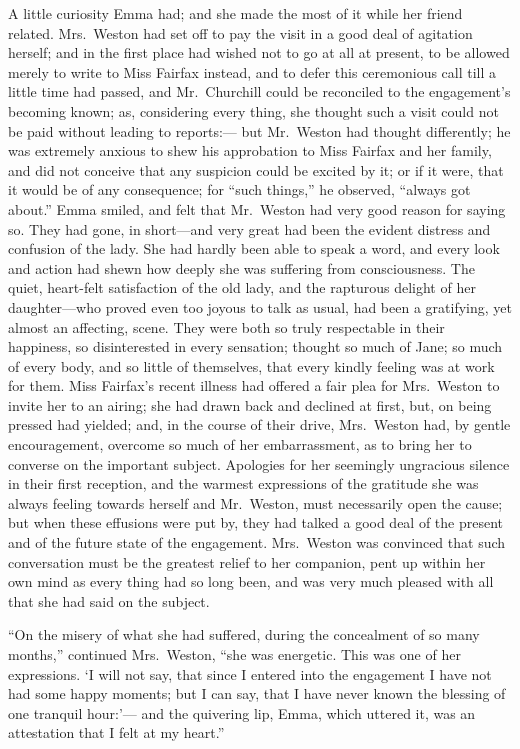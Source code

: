 A little curiosity Emma had; and she made the most of it while
her friend related.  Mrs.\ Weston had set off to pay the visit
in a good deal of agitation herself; and in the first place had
wished not to go at all at present, to be allowed merely to write
to Miss Fairfax instead, and to defer this ceremonious call till
a little time had passed, and Mr.\ Churchill could be reconciled
to the engagement's becoming known; as, considering every thing,
she thought such a visit could not be paid without leading to reports:---%
but Mr.\ Weston had thought differently; he was extremely anxious
to shew his approbation to Miss Fairfax and her family, and did not
conceive that any suspicion could be excited by it; or if it were,
that it would be of any consequence; for ``such things,'' he observed,
``always got about.''  Emma smiled, and felt that Mr.\ Weston had
very good reason for saying so.  They had gone, in short---and very
great had been the evident distress and confusion of the lady.
She had hardly been able to speak a word, and every look and action
had shewn how deeply she was suffering from consciousness.  The quiet,
heart-felt satisfaction of the old lady, and the rapturous delight
of her daughter---who proved even too joyous to talk as usual,
had been a gratifying, yet almost an affecting, scene.  They were
both so truly respectable in their happiness, so disinterested
in every sensation; thought so much of Jane; so much of every body,
and so little of themselves, that every kindly feeling was at work
for them.  Miss Fairfax's recent illness had offered a fair plea
for Mrs.\ Weston to invite her to an airing; she had drawn back and
declined at first, but, on being pressed had yielded; and, in the
course of their drive, Mrs.\ Weston had, by gentle encouragement,
overcome so much of her embarrassment, as to bring her to converse
on the important subject.  Apologies for her seemingly ungracious
silence in their first reception, and the warmest expressions of the
gratitude she was always feeling towards herself and Mr.\ Weston,
must necessarily open the cause; but when these effusions were put by,
they had talked a good deal of the present and of the future state
of the engagement.  Mrs.\ Weston was convinced that such conversation
must be the greatest relief to her companion, pent up within her own
mind as every thing had so long been, and was very much pleased
with all that she had said on the subject.

``On the misery of what she had suffered, during the concealment
of so many months,'' continued Mrs.\ Weston, ``she was energetic.
This was one of her expressions.  `I will not say, that since I
entered into the engagement I have not had some happy moments; but I
can say, that I have never known the blessing of one tranquil hour:'---%
and the quivering lip, Emma, which uttered it, was an attestation
that I felt at my heart.''

